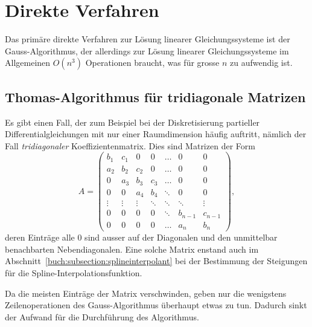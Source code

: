 %
%
%
\section{Direkte Verfahren
\label{buch:section:direkt}}
Das primäre direkte Verfahren zur Lösung linearer Gleichungssysteme ist
der Gauss-Algorithmus, der allerdings
zur Lösung linearer Gleichungssysteme im Allgemeinen $O(n^3)$
Operationen braucht, was für grosse $n$ zu aufwendig ist.
%

%
%

\subsection{Thomas-Algorithmus für tridiagonale Matrizen
\label{buch:subsection:thomasalgorithmus}}
Es gibt einen Fall, der zum Beispiel bei der Diskretisierung
partieller Differentialgleichungen mit nur einer Raumdimension
häufig auftritt, nämlich der Fall {\em tridiagonaler} Koeffizientenmatrix.
Dies sind Matrizen der Form
\begin{equation}
A
=
\begin{pmatrix}
b_1   & c_1   &  0    &  0    &\dots  &  0    &  0     \\
a_2   & b_2   & c_2   &  0    &\dots  &  0    &  0     \\
 0    & a_3   & b_3   & c_3   &\dots  &  0    &  0     \\
 0    &  0    & a_4   & b_4   &\ddots &  0    &  0     \\
\vdots&\vdots &\vdots &\ddots &\ddots &\ddots &\vdots  \\
 0    &  0    &  0    &  0    &\ddots &b_{n-1}&c_{n-1} \\
 0    &  0    &  0    &  0    &\dots  &a_{n}  &b_n
\end{pmatrix},
\end{equation}
deren Einträge alle $0$ sind ausser auf der Diagonalen und den unmittelbar
benachbarten Nebendiagonalen.
%
Eine solche Matrix enstand auch im
Abschnitt~\ref{buch:subsection:splineinterpolant}
bei der Bestimmung der Steigungen für die Spline-Interpolationsfunktion.
%

Da die meisten Einträge der Matrix verschwinden, geben nur die wenigstens
Zeilenoperationen des Gauss-Algorithmus überhaupt etwas zu tun.
Dadurch sinkt der Aufwand für die Durchführung des Algorithmus.
%
%

